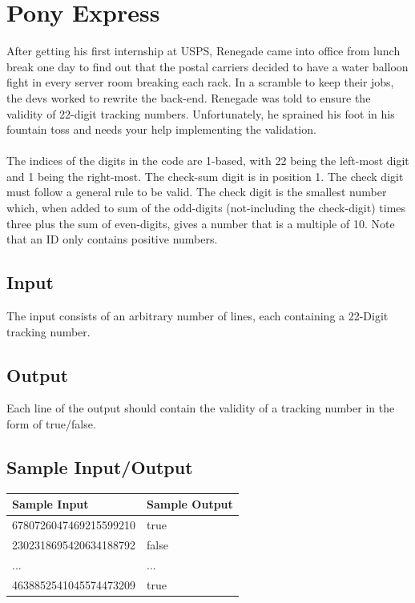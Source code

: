 \documentclass{article}
\let\oldsection\section
\renewcommand\section{\clearpage\oldsection}
\begin{document}
% 

\section{Pony Express}

After getting his first internship at USPS, Renegade came into office from lunch break one day to find out that the postal carriers decided to have a water balloon fight in every server room breaking each rack. In a scramble to keep their jobs, the devs worked to rewrite the back-end. Renegade was told to ensure the validity of 22-digit tracking numbers. Unfortunately, he sprained his foot in his fountain toss and needs your help implementing the validation.  \\
\\
The indices of the digits in the code are 1-based, with 22 being the left-most digit and 1 being the right-most. The check-sum digit is in position 1. The check digit must follow a general rule to be valid. The check digit is the smallest number which, when added to sum of the odd-digits (not-including the check-digit) times three plus the sum of even-digits, gives a number that is a multiple of 10. Note that an ID only contains positive numbers.



\subsection{Input}

The input consists of an arbitrary number of lines, each containing a 22-Digit tracking number.

\subsection{Output}

Each line of the output should contain the validity of a tracking number in the form of true/false.

\subsection{Sample Input/Output}


\begin{center}
	\begin{tabular}{ |l|l| }
		\hline
		\textbf{Sample Input} & \textbf{Sample Output} \\
	   	\hline
		6780726047469215599210 & true\\
		2302318695420634188792 & false\\
        ... & ...\\
        4638852541045574473209 & true\\
        \hline
	\end{tabular}
\end{center}
\end{document}
